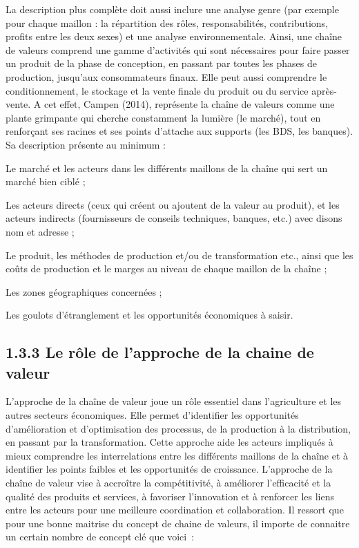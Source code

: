 \documentclass[12pt,oneside]{report}
\begin{document}
La description plus complète doit aussi inclure une analyse genre (par exemple pour chaque maillon : la répartition des rôles, responsabilités, contributions, profits entre les deux sexes) et une analyse environnementale. Ainsi, une chaîne de valeurs comprend une gamme d’activités qui sont nécessaires pour faire passer un produit de la phase de conception, en passant par toutes les phases de production, jusqu’aux consommateurs finaux. Elle peut aussi comprendre le conditionnement, le stockage et la vente finale du produit ou du service après-vente. A cet effet, Campen (2014), représente la chaîne de valeurs comme une plante grimpante qui cherche constamment la lumière (le marché), tout en renforçant ses racines et ses points d’attache aux supports (les BDS, les banques). Sa description présente au minimum :

Le marché et les acteurs dans les différents maillons de la chaîne qui sert un marché bien ciblé ;

Les acteurs directs (ceux qui créent ou ajoutent de la valeur au produit), et les acteurs indirects (fournisseurs de conseils techniques, banques, etc.) avec disons nom et adresse ;

Le produit, les méthodes de production et/ou de transformation etc., ainsi que les coûts de production et le marges au niveau de chaque maillon de la chaîne ;

Les zones géographiques concernées ;

Les goulots d’étranglement et les opportunités économiques à saisir.

\subsection{1.3.3 Le rôle de l’approche de la chaine de valeur}
L'approche de la chaîne de valeur joue un rôle essentiel dans l'agriculture et les autres secteurs économiques. Elle permet d'identifier les opportunités d'amélioration et d'optimisation des processus, de la production à la distribution, en passant par la transformation. Cette approche aide les acteurs impliqués à mieux comprendre les interrelations entre les différents maillons de la chaîne et à identifier les points faibles et les opportunités de croissance. L'approche de la chaîne de valeur vise à accroître la compétitivité, à améliorer l'efficacité et la qualité des produits et services, à favoriser l'innovation et à renforcer les liens entre les acteurs pour une meilleure coordination et collaboration. Il ressort que pour une bonne maitrise du concept de chaine de valeurs, il importe de connaitre un certain nombre de concept clé que voici :
\end{document}
